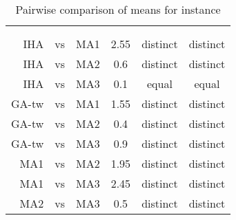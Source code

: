 \documentclass[thesis.tex]{subfiles}
\newcommand{\CurrentInstance}{}
\newcommand{\CurrentInstanceFileEscaped}{}
\newcommand{\CurrentInstanceTexEscaped}{}
\begin{document}

   \renewcommand{\CurrentInstance}{\Instance{1or7}}
   \renewcommand{\CurrentInstanceFileEscaped}{1or7}
   \renewcommand{\CurrentInstanceTexEscaped}{1or7}


\begin{table}[htbp]
   \caption{Pairwise comparison of means for instance \CurrentInstance}
   \label{fig:\CurrentInstanceFileEscaped-mannwhitneyu}
   \centering\small
      \begin{tabular}{r@{\ }c@{\ }l S[table-format=2.2] c c} \toprule
         &&&                          &  \\ \cmidrule(lr){5-6}
         &&&  &  &  \\ \midrule

         \gls{IHA} &vs& \gls{MA1}   &  2.55 & distinct & distinct \\
         \gls{IHA} &vs& \gls{MA2}   &  0.6  & distinct & distinct \\
         \gls{IHA} &vs& \gls{MA3}   &  0.1  &  equal   &  equal   \\
         \gls{GA-tw} &vs& \gls{MA1} &  1.55 & distinct & distinct \\
         \gls{GA-tw} &vs& \gls{MA2} &  0.4  & distinct & distinct \\
         \gls{GA-tw} &vs& \gls{MA3} &  0.9  & distinct & distinct \\
         \gls{MA1} &vs& \gls{MA2}   &  1.95 & distinct & distinct \\
         \gls{MA1} &vs& \gls{MA3}   &  2.45 & distinct & distinct \\
         \gls{MA2} &vs& \gls{MA3}   &  0.5  & distinct & distinct \\
         \bottomrule
      \end{tabular}
\end{table}
   \renewcommand{\CurrentInstance}{\Instance{1on2}}
   \renewcommand{\CurrentInstanceFileEscaped}{1on2}
   \renewcommand{\CurrentInstanceTexEscaped}{1on2}


\end{document}
